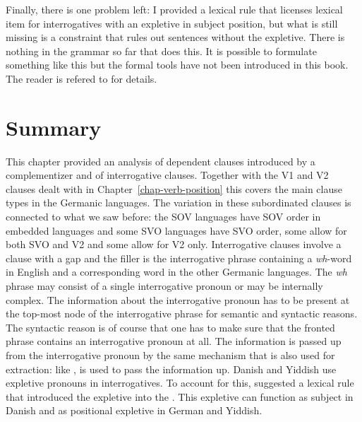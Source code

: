 Finally, there is one problem left: I provided a lexical rule that licenses lexical item for interrogatives with an expletive
in subject position, but what is still missing is a constraint that rules out sentences without the
expletive. There is nothing in the grammar so far that does this. It is possible to formulate
something like this but the formal tools have not been introduced in this book. The reader is
refered to  for details.



\section{Summary}

This chapter provided an analysis of dependent clauses introduced by a complementizer and of
interrogative clauses. Together with the V1 and V2 clauses dealt with in Chapter~\ref{chap-verb-position} this covers
the main clause types in the Germanic languages. The variation in these subordinated clauses is
connected to what we saw before: the SOV languages have SOV order in embedded languages and some SVO
languages have SVO order, some allow for both SVO and V2 and some allow for V2 only. Interrogative
clauses involve a clause with a gap and the filler is the interrogative phrase containing a
\emph{wh}-word in English and a corresponding word in the other Germanic languages. The \emph{wh}
phrase may consist of a single interrogative pronoun or may be internally complex. The information
about the interrogative pronoun has to be present at the top-most node of the interrogative phrase
for semantic and syntactic reasons. The syntactic reason is of course that one has to make sure that
the fronted phrase contains an interrogative pronoun at all. The information is passed up from the
interrogative pronoun by the same mechanism that is also used for extraction: like \slasch, \que is used
to pass the information up. Danish and Yiddish use expletive pronouns in interrogatives. To
account for this,  suggested a lexical rule that introduced the expletive into the
\argstl. This expletive can function as subject in Danish and as positional expletive in German and
Yiddish.




